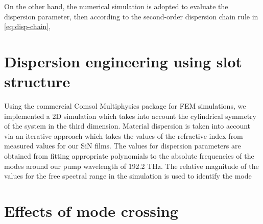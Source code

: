 On the other hand, the numerical simulation is adopted to evaluate the dispersion parameter, then according to the second-order dispersion chain rule in \autoref{eq:disp-chain}, 



\section{Dispersion engineering using slot structure}




Using the commercial Comsol Multiphysics package for FEM simulations, we implemented a 2D simulation which takes into account the cylindrical symmetry of the system in the third dimension. Material dispersion is taken into account via an iterative approach which takes the values of the refractive index from measured values for our SiN films. The values for dispersion parameters are obtained from fitting appropriate polynomials to the absolute frequencies of the modes around our pump wavelength of 192.2 THz. The relative magnitude of the values for the free spectral range in the simulation is used to identify the mode

\section{Effects of mode crossing}